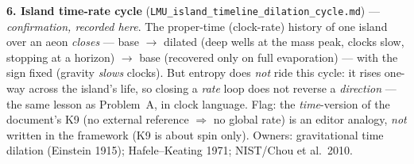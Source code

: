 \documentclass[11pt]{article}
\begin{document}
\smallskip\noindent\textbf{6. Island time-rate cycle} (\texttt{LMU\_island\_timeline\_dilation\_cycle.md}) --- \emph{confirmation, recorded here}. The proper-time (clock-rate) history of one island over an aeon \emph{closes} --- base $\to$ dilated (deep wells at the mass peak, clocks slow, stopping at a horizon) $\to$ base (recovered only on full evaporation) --- with the sign fixed (gravity \emph{slows} clocks). But entropy does \emph{not} ride this cycle: it rises one-way across the island's life, so closing a \emph{rate} loop does not reverse a \emph{direction} --- the same lesson as Problem~A, in clock language. Flag: the \emph{time}-version of the document's K9 (no external reference $\Rightarrow$ no global rate) is an editor analogy, \emph{not} written in the framework (K9 is about spin only). Owners: gravitational time dilation (Einstein 1915); Hafele--Keating 1971; NIST/Chou et al.\ 2010.
\end{document}
